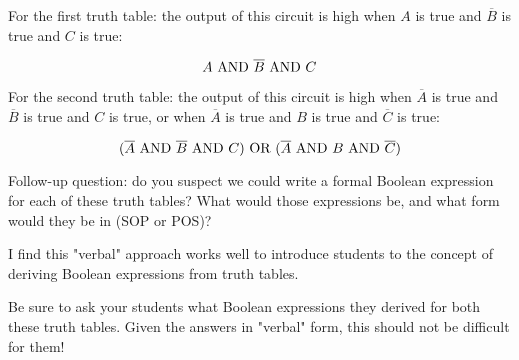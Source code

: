





For the first truth table: the output of this circuit is high when $A$ is true and $\overline{B}$ is true and $C$ is true:

$$A \hbox{ AND } \overline{B} \hbox{ AND } C$$

\vskip 10pt

For the second truth table: the output of this circuit is high when $\overline{A}$ is true and $\overline{B}$ is true and $C$ is true, or when $\overline{A}$ is true and $B$ is true and $\overline{C}$ is true:

$$(\overline{A} \hbox{ AND } \overline{B} \hbox{ AND } C) \hbox{ OR } (\overline{A} \hbox{ AND } B \hbox{ AND } \overline{C})$$

\vskip 10pt

Follow-up question: do you suspect we could write a formal Boolean expression for each of these truth tables?  What would those expressions be, and what form would they be in (SOP or POS)?







I find this "verbal" approach works well to introduce students to the concept of deriving Boolean expressions from truth tables.

Be sure to ask your students what Boolean expressions they derived for both these truth tables.  Given the answers in "verbal" form, this should not be difficult for them!




